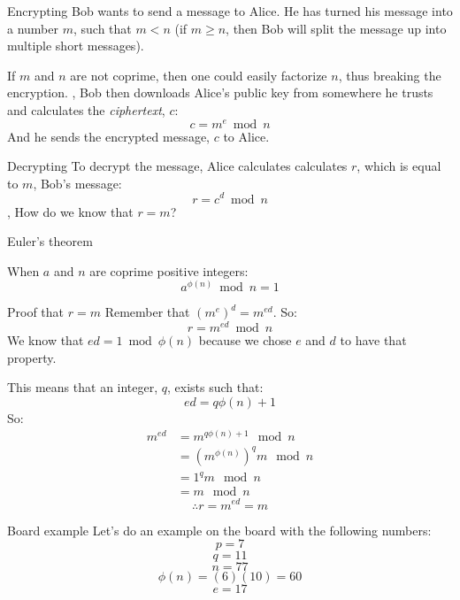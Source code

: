 \begin{namedframe}{Encrypting}
	Bob wants to send a message to Alice.
	He has turned his message into a number $m$, such that $m < n$ (if $m \geq n$, then Bob will split the message up into multiple short messages).

	If $m$ and $n$ are not coprime, then one could easily factorize $n$, thus breaking the encryption.
	\sep
	Bob then downloads Alice's public key from somewhere he trusts and calculates the \emph{ciphertext}, $c$:
	\[c = m^e \bmod n\]
	And he sends the encrypted message, $c$ to Alice.
\end{namedframe}
\begin{namedframe}{Decrypting}
	To decrypt the message, Alice calculates calculates $r$, which is equal to $m$, Bob's message:
	\[r = c^d \bmod n\]
	\sep
	How do we know that $r = m$?
\end{namedframe}
\begin{namedframe}{Euler's theorem}
	\begin{theorem}
		When $a$ and $n$ are coprime positive integers:
		\[a^{\phi(n)} \bmod n = 1\]
	\end{theorem}
\end{namedframe}
\begin{namedframe}{Proof that $r = m$}
	Remember that $\left(m^e\right)^d = m^{ed}$. So:
	\[r = m^{ed} \bmod n\]
	\pause
	We know that $ed = 1 \bmod \phi(n)$ because we chose $e$ and $d$ to have that property.

	This means that an integer, $q$, exists such that:
	\[ed = q\phi(n) + 1\]
	\pause
	So:
	\begin{align*}
		m^{ed} &= m^{q\phi(n) + 1} \mod n\\
		       &= \left(m^{\phi(n)}\right)^q m \mod n\\
		       &= 1^q m \mod n\\
		       &= m \mod n
	\end{align*}
	\[\therefore r = m^{ed} = m\]
\end{namedframe}
\begin{namedframe}{Board example}
	Let's do an example on the board with the following numbers:
	\[p = 7\]
	\[q = 11\]
	\[n = 77\]
	\[\phi(n) = (6)(10) = 60\]
	\[e = 17\]
\end{namedframe}
